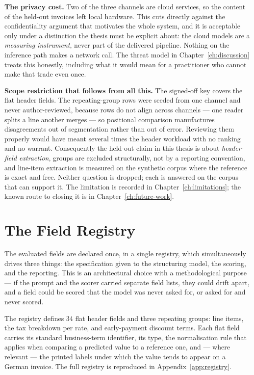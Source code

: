 \textbf{The privacy cost.} Two of the three channels are cloud
services, so the content of the held-out invoices left local hardware. This cuts directly
against the confidentiality argument that motivates the whole system, and it is acceptable
only under a distinction the thesis must be explicit about: the cloud models are a
\emph{measuring instrument}, never part of the delivered pipeline. Nothing on the inference
path makes a network call. The threat model in Chapter~\ref{ch:discussion} treats this
honestly, including what it would mean for a practitioner who cannot make that trade even
once.

\textbf{Scope restriction that follows from all this.} The signed-off key covers the flat
header fields. The repeating-group rows were seeded from one channel and never
author-reviewed, because rows do not align across channels --- one reader splits a line
another merges --- so positional comparison manufactures disagreements out of segmentation
rather than out of error. Reviewing them properly would have meant several times the header
workload with no ranking and no warrant. Consequently the held-out claim in this thesis is
about \emph{header-field extraction}, groups are excluded structurally, not by a
reporting convention, and line-item extraction is measured on the synthetic corpus where the
reference is exact and free. Neither question is dropped; each is answered on the corpus that
can support it. The limitation is recorded in
Chapter~\ref{ch:limitations}; the known route to closing it is in Chapter~\ref{ch:future-work}.

\section{The Field Registry}
\label{sec:method-schema}

The evaluated fields are declared once, in a single registry, which simultaneously drives
three things: the specification given to the structuring model, the scoring, and the
reporting. This is an architectural choice with a methodological purpose --- if the prompt and
the scorer carried separate field lists, they could drift apart, and a field could be scored
that the model was never asked for, or asked for and never scored.

The registry defines 34 flat header fields and three repeating groups: line items, the tax
breakdown per rate, and early-payment discount terms. Each flat field carries its
standard business-term identifier, its type, the normalisation rule that applies when
comparing a predicted value to a reference one, and --- where relevant --- the printed labels
under which the value tends to appear on a German invoice. The full registry is reproduced in
Appendix~\ref{app:registry}.

